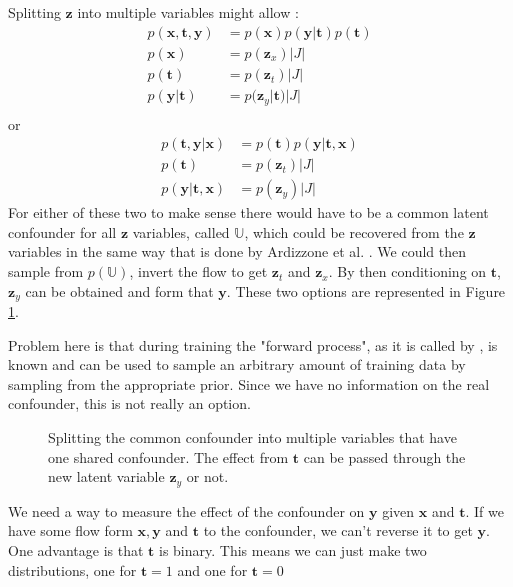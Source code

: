 \documentclass{article}
\newcommand{\bt}{\mathbf{t}}
\newcommand{\bU}{\mathbb{U}}
\newcommand{\bx}{\mathbf{x}}
\newcommand{\by}{\mathbf{y}}
\newcommand{\bz}{\mathbf{z}}
\begin{document}
\subsection{}
Splitting $\bz$ into multiple variables might allow :
\begin{align}
    p(\bx, \bt, \by) &= p(\bx)p(\by|\bt)p(\bt)\\
    p(\bx) &= p(\bz_x) |J|\\
    p(\bt) &= p(\bz_t) |J|\\
    p(\by| \bt) &= p(\bz_y|\bt) |J|\\
\end{align}
or
\begin{align}
    p(\bt, \by | \bx) &= p(\bt) p(\by | \bt, \bx)\\
    p(\bt) &= p(\bz_t) |J|\\
    p(\by | \bt, \bx) &= p(\bz_y) |J|
\end{align}
For either of these two to make sense there would have to be a common latent confounder for all $\bz$ variables, called $\bU$, which could be recovered from the $\bz$ variables in the same way that is done by Ardizzone et al. \cite{ardizzone2018analyzing}. We could then sample from $p(\bU)$, invert the flow to get $\bz_t$ and $\bz_x$. By then conditioning on $\bt$, $\bz_y$ can be obtained and form that $\by$. These two options are represented in Figure \ref{fig:causal_graph_split_confounder}.

Problem here is that during training the "forward process", as it is called by \cite{ardizzone2018analyzing}, is known and can be used to sample an arbitrary amount of training data by sampling from the appropriate prior. Since we have no information on the real confounder, this is not really an option.

\begin{figure}
    \centering
    
    \caption{Splitting the common confounder into multiple variables that have one shared confounder. The effect from $\bt$ can be passed through the new latent variable $\bz_y$ or not.}
    \label{fig:causal_graph_split_confounder}
\end{figure}


We need a way to measure the effect of the confounder on $\by$ given $\bx$  and $\bt$. If we have some flow form $\bx, \by$ and $\bt$ to the confounder, we can't reverse it to get $\by$. One advantage is that $\bt$ is binary. This means we can just make two distributions, one for $\bt=1$ and one for $\bt=0$ 
\end{document}
